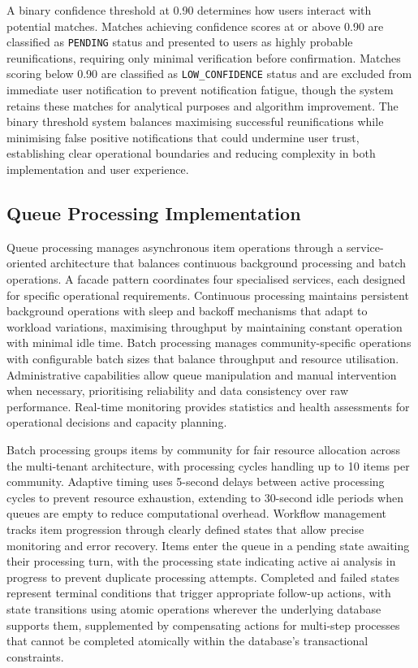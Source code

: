 A binary confidence threshold at 0.90 determines how users interact with potential matches. Matches achieving confidence scores at or above 0.90 are classified as \texttt{PENDING} status and presented to users as highly probable reunifications, requiring only minimal verification before confirmation. Matches scoring below 0.90 are classified as \texttt{LOW\_CONFIDENCE} status and are excluded from immediate user notification to prevent notification fatigue, though the system retains these matches for analytical purposes and algorithm improvement. The binary threshold system balances maximising successful reunifications while minimising false positive notifications that could undermine user trust, establishing clear operational boundaries and reducing complexity in both implementation and user experience.

\subsection{Queue Processing Implementation} \label{subsection:queue_processing}

Queue processing manages asynchronous item operations through a service-oriented architecture that balances continuous background processing and batch operations. A facade pattern coordinates four specialised services, each designed for specific operational requirements. Continuous processing maintains persistent background operations with sleep and backoff mechanisms that adapt to workload variations, maximising throughput by maintaining constant operation with minimal idle time. Batch processing manages community-specific operations with configurable batch sizes that balance throughput and resource utilisation. Administrative capabilities allow queue manipulation and manual intervention when necessary, prioritising reliability and data consistency over raw performance. Real-time monitoring provides statistics and health assessments for operational decisions and capacity planning.

Batch processing groups items by community for fair resource allocation across the multi-tenant architecture, with processing cycles handling up to 10 items per community. Adaptive timing uses 5-second delays between active processing cycles to prevent resource exhaustion, extending to 30-second idle periods when queues are empty to reduce computational overhead. Workflow management tracks item progression through clearly defined states that allow precise monitoring and error recovery. Items enter the queue in a pending state awaiting their processing turn, with the processing state indicating active \ac{ai} analysis in progress to prevent duplicate processing attempts. Completed and failed states represent terminal conditions that trigger appropriate follow-up actions, with state transitions using atomic operations wherever the underlying database supports them, supplemented by compensating actions for multi-step processes that cannot be completed atomically within the database's transactional constraints.

